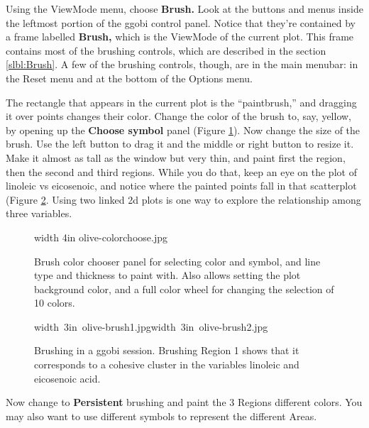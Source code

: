 \documentclass[11pt]{article}
\begin{document}
Using the ViewMode menu, choose {\bf Brush.}  Look at the buttons and
menus inside the leftmost portion of the ggobi control panel.  Notice
that they're contained by a frame labelled {\bf Brush,} which is the
ViewMode of the current plot.  This frame contains most of the
brushing controls, which are described in the section
\ref{slbl:Brush}.  A few of the brushing controls, though, are in the
main menubar: in the Reset menu and at the bottom of the Options menu.

The rectangle that appears in the current plot is the ``paintbrush,''
and dragging it over points changes their color. Change the color of
the brush to, say, yellow, by opening up the {\bf Choose symbol} panel
(Figure \ref{fig2}). Now change the size of the brush.  Use the left
button to drag it and the middle or right button to resize it.  Make
it almost as tall as the window but very thin, and paint first the
region, then the second and third regions.  While you do that, keep an
eye on the plot of linoleic vs eicosenoic, and notice where the
painted points fall in that scatterplot (Figure \ref{fig3}.  Using two
linked 2d plots is one way to explore the relationship among three
variables.

\begin{figure}[htp]
\vspace{-0.5in}
\pdfimage width 4in {olive-colorchoose.jpg}
\caption{Brush color chooser panel for selecting color and symbol, 
and line type and thickness to paint with. Also allows setting the 
plot background color, and a full color wheel for changing the selection
of 10 colors.
}%
\label{fig2}
\end{figure}

\begin{figure}[htp]
\hbox{\pdfimage width 3in {olive-brush1.jpg}\pdfimage width 3in {olive-brush2.jpg}}
\caption{Brushing in a ggobi session. Brushing Region 1 shows that it
corresponds to a cohesive cluster in the variables linoleic and 
eicosenoic acid.
}%
\label{fig3}
\end{figure}

Now change to {\bf Persistent} brushing and paint the 3 Regions
different colors. You may also want to use different symbols to
represent the different Areas. 
\end{document}
